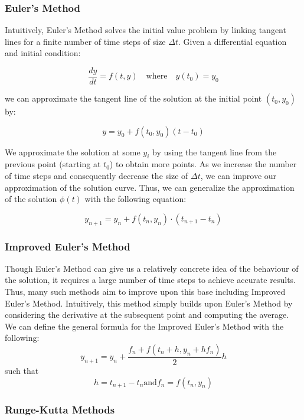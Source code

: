 \documentclass{article} %
\begin{document}
\begin{multicols}{2}
\subsubsection{Euler's Method}
\label{subsubsec:euler_method}

Intuitively, Euler's Method solves the initial value problem by linking tangent lines for a finite number of time steps of size $\Delta t$.
Given a differential equation and initial condition:

\[
    \frac{dy}{dt} = f(t, y) \quad \text{where} \quad y(t_{0}) = y_{0}
\]

we can approximate the tangent line of the solution at the initial point $(t_{0}, y_{0})$ by:

\[
    y = y_{0} + f(t_{0}, y_{0})(t - t_{0})
\]

We approximate the solution at some $y_{i}$ by using the tangent line from the previous point (starting at $t_{0}$) to obtain more points.
As we increase the number of time steps and consequently decrease the size of $\Delta t$, we can improve our approximation of the solution curve.
Thus, we can generalize the approximation of the solution $\phi(t)$ with the following equation:

\[
    y_{n+1} = y_{n} + f(t_{n}, y_{n}) \cdot (t_{n+1} - t_{n})
\]

\subsubsection{Improved Euler's Method}
\label{subsubsec:improved_euler_method} %

Though Euler's Method can give us a relatively concrete idea of the behaviour of the solution, it requires a large number of time steps to achieve accurate results.
Thus, many such methods aim to improve upon this base including Improved Euler's Method.
Intuitively, this method simply builds upon Euler's Method by considering the derivative at the subsequent point and computing the average.
We can define the general formula for the Improved Euler's Method with the following:
\[
    y_{n+1} = y_{n} + \frac{f_{n} + f(t_{n} + h, y_{n} + hf_{n})}{2}h
\]
such that 
\[
    h = t_{n + 1} - t_{n} \text{and} f_{n} = f(t_{n}, y_{n})
\]

\subsubsection{Runge-Kutta Methods}
\label{subsubsec:runge_kutta}


\end{multicols}
\end{document}
